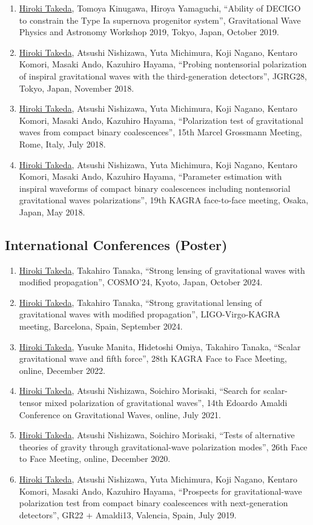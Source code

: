 \documentclass[uplatex, 12pt]{article}
\begin{document}
\begin{enumerate}
\item \uline{Hiroki Takeda}, Tomoya Kinugawa, Hiroya Yamaguchi, “Ability of DECIGO to constrain the Type Ia supernova progenitor system”, Gravitational Wave Physics and Astronomy Workshop 2019, Tokyo, Japan, October 2019.
\item \uline{Hiroki Takeda}, Atsushi Nishizawa, Yuta Michimura, Koji Nagano, Kentaro Komori, Masaki Ando, Kazuhiro Hayama, “Probing nontensorial polarization of inspiral gravitational waves with the third-generation detectors”, JGRG28, Tokyo, Japan, November 2018.
\item \uline{Hiroki Takeda}, Atsushi Nishizawa, Yuta Michimura, Koji Nagano, Kentaro Komori, Masaki Ando, Kazuhiro Hayama, “Polarization test of gravitational waves from compact binary coalescences”, 15th Marcel Grossmann Meeting, Rome, Italy, July 2018.
\item \uline{Hiroki Takeda}, Atsushi Nishizawa, Yuta Michimura, Koji Nagano, Kentaro Komori, Masaki Ando, Kazuhiro Hayama, “Parameter estimation with inspiral waveforms of compact binary coalescences including nontensorial gravitational waves polarizations”, 19th KAGRA face-to-face meeting, Osaka, Japan, May 2018.
\end{enumerate}
\subsection*{International Conferences (Poster)}
\begin{enumerate}
\item \uline{Hiroki Takeda}, Takahiro Tanaka, “Strong lensing of gravitational waves with modified propagation”, COSMO'24, Kyoto, Japan, October 2024.
\item \uline{Hiroki Takeda}, Takahiro Tanaka, “Strong gravitational lensing of gravitational waves with modified propagation”, LIGO-Virgo-KAGRA meeting, Barcelona, Spain, September 2024.
\item \uline{Hiroki Takeda}, Yusuke Manita, Hidetoshi Omiya, Takahiro Tanaka, “Scalar gravitational wave and fifth force”, 28th KAGRA Face to Face Meeting, online, December 2022.
\item \uline{Hiroki Takeda}, Atsushi Nishizawa, Soichiro Morisaki, “Search for scalar-tensor mixed polarization of gravitational waves”, 14th Edoardo Amaldi Conference on Gravitational Waves, online, July 2021.
\item \uline{Hiroki Takeda}, Atsushi Nishizawa, Soichiro Morisaki, “Tests of alternative theories of gravity through gravitational-wave polarization modes”, 26th Face to Face Meeting, online, December 2020.
\item \uline{Hiroki Takeda}, Atsushi Nishizawa, Yuta Michimura, Koji Nagano, Kentaro Komori, Masaki Ando, Kazuhiro Hayama, “Prospects for gravitational-wave polarization test from compact binary coalescences with next-generation detectors”, GR22 + Amaldi13, Valencia, Spain, July 2019.
\end{enumerate}
\end{document}
